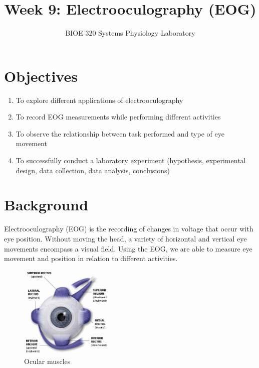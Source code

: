 \documentclass{article}
\title{Week 9: Electrooculography (EOG)}
\author{BIOE 320 Systems Physiology Laboratory}
\date{}
\begin{document}
\large
\maketitle

\section*{Objectives}
\begin{enumerate}
	\item To explore different applications of electrooculography
	\item To record EOG measurements while performing different activities
	\item To observe the relationship between task performed and type of eye movement
	\item To successfully conduct a laboratory experiment (hypothesis, experimental design, data collection, data analysis, conclusions)
\end{enumerate}

\section*{Background}
Electrooculography (EOG) is the recording of changes in voltage that occur with eye position. Without moving the head, a variety of horizontal and vertical eye movements encompass a visual field. Using the EOG, we are able to measure eye movement and position in relation to different activities.

\begin{figure}[h]
\centering\includegraphics[width=0.4\textwidth]{../images/EOG_1.jpg}
\caption{Ocular muscles}
\label{eye}
\end{figure}
\end{document}
